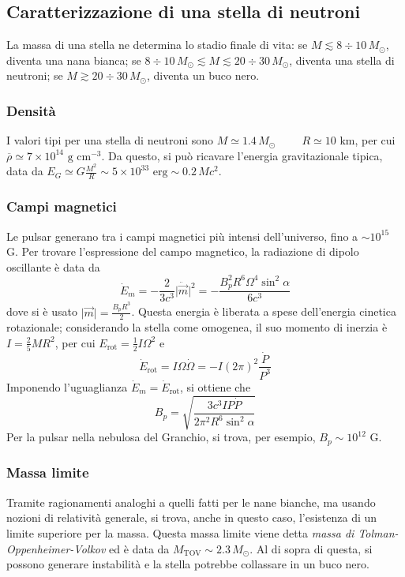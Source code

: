 \documentclass[11pt, a4paper]{scrartcl}
\theoremstyle{style}
\theoremstyle{style1}
\numberwithin{equation}{subsection}
\begin{document}
\subsection{Caratterizzazione di una stella di neutroni}
La massa di una stella ne determina lo stadio finale di vita: se $M\lesssim 8 \div 10 \, M_\odot $, diventa una nana bianca; se $8\div 10 \, M_\odot  \lesssim M \lesssim 20 \div 30 \, M_\odot $, diventa una stella di neutroni; se $M \gtrsim 20\div 30 \, M_\odot $, diventa un buco nero.
\subsubsection{Densit\`a}
I valori tipi per una stella di neutroni sono $M \simeq 1.4 \, M_\odot \hspace{1cm} R \simeq 10\text{ km} $, per cui $\overline{\rho } \simeq 7 \times 10^{14} \text{ g cm}^{-3}$.
Da questo, si pu\`o ricavare l'energia gravitazionale tipica, data da $E_G \simeq G \frac{M^2}{R} \sim 5 \times 10 ^{33}\text{ erg} \sim 0.2 \, Mc^2$.
\subsubsection{Campi magnetici}
Le pulsar generano tra i campi magnetici pi\`u intensi dell'universo, fino a $\sim 10^{15} $ G.
Per trovare l'espressione del campo magnetico, la radiazione di dipolo oscillante \`e data da 
\[
\dot{E}_m = -\frac{2}{3c^3} \lvert \ddot{\vec{m}}  \rvert ^2 = -\frac{B_p^2 R^6 \Omega ^4 \sin ^2 \alpha }{6c^3}
\] 
dove si \`e usato $\lvert \vec{m} \rvert = \frac{B_p R^3}{2}$.
Questa energia \`e liberata a spese dell'energia cinetica rotazionale; considerando la stella come omogenea, il suo momento di inerzia \`e $I = \frac{2}{5} MR^2$, per cui $E_\text{rot} = \frac{1}{2} I \Omega ^2$ e 
\[
\dot{E}_\text{rot} = I \Omega  \dot{\Omega } = - I (2\pi)^2 \frac{\dot{P}}{P^3}
\] 
Imponendo l'uguaglianza $\dot{E}_m = \dot{E}_\text{rot}$, si ottiene che 
\[
B_p = \sqrt{\frac{3c^3 I P \dot{P}}{2\pi^2 R^6 \sin^2 \alpha }} 
\] 
Per la pulsar nella nebulosa del Granchio, si trova, per esempio, $B_p \sim 10^{12} $ G.
 
\subsubsection{Massa limite}
Tramite ragionamenti analoghi a quelli fatti per le nane bianche, ma usando nozioni di relativit\`a generale, si trova, anche in questo caso, l'esistenza di un limite superiore per la massa.
Questa massa limite viene detta \textit{massa di Tolman-Oppenheimer-Volkov} ed \`e data da $M_\text{TOV} \sim 2.3 \, M_\odot $.
Al di sopra di questa, si possono generare instabilit\`a e la stella potrebbe collassare in un buco nero.
 
\end{document}
